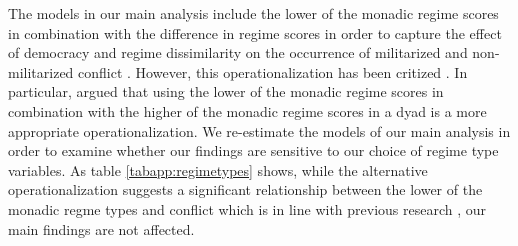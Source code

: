\documentclass[12pt]{article}
\theoremstyle{hypothesis}
\begin{document}
The models in our main analysis include the lower of the monadic regime scores in combination with the difference in regime scores in order to capture the effect of democracy and regime dissimilarity on the occurrence of militarized and non-militarized conflict \citep{Gartzke:2013,Weisiger:2016}. However, this operationalization has been critized \citep{Choi:2015}. In particular, \citet{Choi:2015} argued that using the lower of the monadic regime scores in combination with the higher of the monadic regime scores in a dyad is a more appropriate operationalization. We re-estimate the models of our main analysis in order to examine whether our findings are sensitive to our choice of regime type variables. As table \ref{tabapp:regimetypes} shows, while the alternative operationalization suggests a significant relationship between the lower of the monadic regme types and conflict which is in line with previous research \citep{Choi:2015}, our main findings are not affected.



\newpage

%
%
\end{document}

